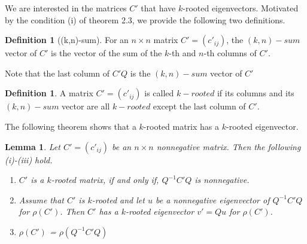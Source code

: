 \documentclass[12pt]{report}
\theoremstyle{plain}
\newtheorem{lem}[thm]{Lemma}
\theoremstyle{definition}
\newtheorem{defn}[thm]{Definition}
\begin{document}
We are interested in the matrices $C'$ that have $k$-rooted eigenvectors.
Motivated by the condition (i) of theorem 2.3, we provide the following two definitions. 

\begin{defn}[(k,n)-sum]
For an $n \times n$ matrix $C'=(c'_{ij})$, the $(k, n)-sum$ vector of $C'$ is the vector of the sum of the $k$-th and  $n$-th columns of $C'$.
\end{defn}

Note that the last column of $C'Q$ is the $(k, n)-sum$ vector of $C'$

\begin{defn}\label{m_rooted}
A  matrix $C'=(c'_{ij})$ is called $k-rooted$  if its  columns and its $(k, n)-sum$ vector are all $k-rooted$ except the last column of $C'$.
\end{defn}

The following theorem shows that a $k$-rooted matrix has a $k$-rooted eigenvector. 
\begin{lem} \label{lma_m_rooted}
Let $C'=(c'_{ij})$ be an $n\times n$ nonnegative matrix. Then the following (i)-(iii) hold.
    \begin{enumerate}[label=(\roman*)]
        \item $C'$ is a $k$-rooted matrix, if and only if, $Q^{-1}C'Q$ is nonnegative.
        \item Assume that $C'$ is $k$-rooted and let $u$ be a nonnegative eigenvector of $Q^{-1}C'Q$
         for $\rho(C')$. Then  $C'$ has a $k$-rooted eigenvector $v'=Qu$ for $\rho(C')$. 
        \item $\rho(C')$ = $\rho(Q^{-1}C'Q)$
    \end{enumerate}
\end{lem}
\end{document}

